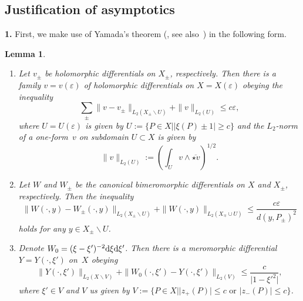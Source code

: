 \documentclass[pdftex]{sigma}
\numberwithin{equation}{section}
\newtheorem{Lemma}[Theorem]{Lemma}
\theoremstyle{definition}
\begin{document}
\subsection*{Justification of asymptotics}

{\bf 1.} First, we make use of Yamada's theorem (\cite[Lemma~1 and Theorem~1 on p.~116]{Yamada}, see also~\cite[Lemma~1]{KokTAMS}) in the following form.

\begin{Lemma}\label{Yamada lemma}\qquad
\begin{enumerate}\itemsep=0pt
\item[$(i)$] Let $v_\pm$ be holomorphic differentials on $X_\pm$, respectively. Then there is a family $v=v(\varepsilon)$ of holomorphic differentials on $X=X(\varepsilon)$ obeying the inequality
\begin{equation}
\label{Yamada est}
\sum_{\pm}\|v-v_\pm\|_{L_2(X_\pm\backslash U)}+\|v\|_{L_2(U)}\le c\varepsilon,
\end{equation}
where $U=U(\varepsilon)$ is given by
$U:=\{P\in X | |\xi(P)\pm 1|\ge c\}$
and the $L_2$-norm of a one-form~$v$ on subdomain $U\subset X$ is given by
\[\|v\|_{L_2(U)}:=\left(\int_{U}v\wedge\overline{\star v}\right)^{1/2}.\]
\item[$(ii)$] Let $W$ and $W_\pm$ be the canonical bimeromorphic differentials on $X$ and $X_\pm$, respectively. Then the inequality
\begin{equation}
\label{Yamada est merom}
\|W(\cdot,y)-W_\pm(\cdot,y)\|_{L_2(X_\pm\backslash U)}+\|W(\cdot,y)\|_{L_2(X_\mp\cup U)}\le \frac{c\varepsilon}{ d(y,P_\pm)^2}
\end{equation}
holds for any $y\in X_\pm\backslash U$.
\item[$(iii)$] Denote $W_0=(\xi-\xi')^{-2}{\rm d}\xi {\rm d}\xi'$. Then there is a meromorphic differential $Y=Y(\cdot,\xi')$ on~$X$ obeying
\begin{equation}
\label{Yamada est on pinch}
\|Y(\cdot,\xi')\|_{L_2(X\backslash V)}+\|W_0(\cdot,\xi')-Y(\cdot,\xi')\|_{L_2(V)}\le \frac{c}{\big|1-\xi'^2\big|},
\end{equation}
where $\xi'\in V$ and $V$ us given by
$V:=\{P\in X | |z_+(P)|\le c \text{ or } |z_-(P)|\le c\}$.
\end{enumerate}
\end{Lemma}
\end{document}
